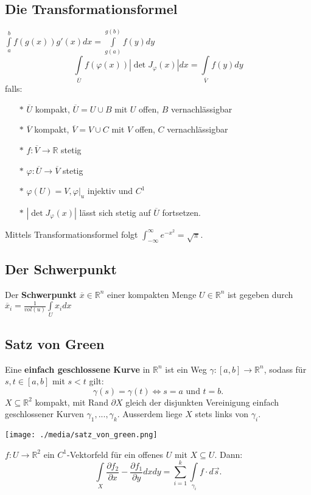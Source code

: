\subsection{Die Transformationsformel}
    $\int\limits_a^bf(g(x))g'(x)dx=\int\limits_{g(a)}^{g(b)}f(y)dy$\\
    $$\int\limits_{\overline U}f(\varphi(x))|\det
    J_\varphi(x)|dx=\int\limits_{\overline V}f(y)dy$$
    falls:\begin{enumerate}
      \item[$*$] $\overline U$ kompakt, $\overline U=U\cup B$ mit $U$ offen, $B$
        vernachlässigbar
      \item[$*$] $\overline V$ kompakt, $\overline V=V\cup C$ mit $V$ offen, $C$
        vernachlässigbar
      \item[$*$] $f:\overline V\rightarrow\mathbb R$ stetig
      \item[$*$] $\varphi:\overline U\rightarrow\overline V$ stetig
      \item[$*$] $\varphi(U)=V, \varphi|_u$ injektiv und $C^1$
      \item[$*$] $|\det J_\varphi(x)|$ lässt sich stetig auf $\overline U$
        fortsetzen.
    \end{enumerate}
    Mittels Transformationsformel folgt $\int_{-\infty}^{\infty}e^{-x^2} = \sqrt{\pi}$.\\
    \subsection{Der Schwerpunkt}
    Der \textbf{Schwerpunkt} $\overline x\in\mathbb R^n$ einer kompakten Menge
    $U\in\mathbb R^n$ ist gegeben durch $\overline
    x_i=\frac{1}{vol(u)}\int\limits_Ux_idx$
\subsection{Satz von Green}
    Eine \textbf{einfach geschlossene Kurve} in $\mathbb R^n$ ist ein Weg
    $\gamma:[a,b]\rightarrow\mathbb R^n$, sodass für $s,t\in[a,b]$ mit $s<t$
    gilt: $$\gamma(s)=\gamma(t)\iff s=a\text{ und } t=b.$$
    $X\subseteq\mathbb R^2$ kompakt, mit Rand $\partial X$ gleich der disjunkten
    Vereinigung einfach geschlossener Kurven $\gamma_1,...,\gamma_k$. Ausserdem
    liege $X$ stets links von $\gamma_i$.
  \begin{minipage}{\linewidth}
    \texttt{[image: ./media/satz\_von\_green.png]}
  \end{minipage}
  $f:U\rightarrow\mathbb R^2$ ein $C^1$-Vektorfeld für ein offenes $U$ mit
  $X\subseteq U$. Dann: $$\int\limits_X\frac{\partial f_2}{\partial
  x}-\frac{\partial f_1}{\partial y}dxdy =
  \sum\limits_{i=1}^k\int\limits_{\gamma_i}f\cdot d\overrightarrow s.$$
  \vfil\null
